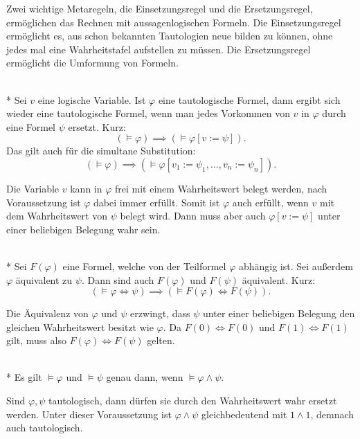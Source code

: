 Zwei wichtige Metaregeln, die Einsetzungsregel und die
Ersetzungsregel, ermöglichen das Rechnen mit aussagenlogischen
Formeln. Die Einsetzungsregel ermöglicht es, aus schon bekannten
Tautologien neue bilden zu können, ohne jedes mal eine Wahrheitstafel
aufstellen zu müssen. Die Ersetzungsregel ermöglicht die Umformung
von Formeln.

\begin{Satz}[Einsetzungsregel]\mbox{}\\*
Sei $v$ eine logische Variable. Ist $\varphi$ eine tautologische
Formel, dann ergibt sich wieder eine tautologische Formel, wenn man
jedes Vorkommen von $v$ in $\varphi$ durch eine Formel $\psi$ ersetzt.
Kurz:
\[(\models \varphi )\implies (\models \varphi [v:=\psi]).\]
Das gilt auch für die simultane Substitution:
\[(\models \varphi )\implies
(\models \varphi [v_1:=\psi_1,\ldots ,v_n:=\psi_n]).\]
\end{Satz}
 Die Variable $v$ kann in $\varphi$
frei mit einem Wahrheitswert belegt werden, nach Voraussetzung
ist $\varphi$ dabei immer erfüllt. Somit ist $\varphi$ auch
erfüllt, wenn $v$ mit dem Wahrheitswert von $\psi$ belegt wird.
Dann muss aber auch $\varphi[v:=\psi]$ unter einer beliebigen Belegung
wahr sein.\;\qedsymbol

\newpage
\begin{Satz}[Ersetzungsregel]%
\label{Ersetzungsregel}\mbox{}\\*
Sei $F(\varphi)$ eine Formel, welche von der Teilformel $\varphi$
abhängig ist. Sei außerdem $\varphi$ äquivalent zu $\psi$.
Dann sind auch $F(\varphi)$ und $F(\psi)$ äquivalent. Kurz:
\[(\models\varphi\Leftrightarrow\psi)
\implies (\models F(\varphi)\Leftrightarrow F(\psi)).\]
\end{Satz}
Die Äquivalenz von $\varphi$ und $\psi$ erzwingt, dass $\psi$
unter einer beliebigen Belegung den gleichen Wahrheitswert besitzt
wie $\varphi$. Da $F(0)\Leftrightarrow F(0)$ und
$F(1)\Leftrightarrow F(1)$ gilt, muss also
$F(\varphi)\Leftrightarrow F(\psi)$ gelten.\;\qedsymbol

\begin{Satz}\mbox{}\\*
Es gilt $\models\varphi$ und $\models\psi$
genau dann, wenn $\models\varphi\land\psi$.
\end{Satz}
Sind $\varphi,\psi$ tautologisch, dann dürfen sie durch
den Wahrheitswert wahr ersetzt werden. Unter dieser Voraussetzung
ist $\varphi\land\psi$ gleichbedeutend mit $1\land 1$, demnach
auch tautologisch.

